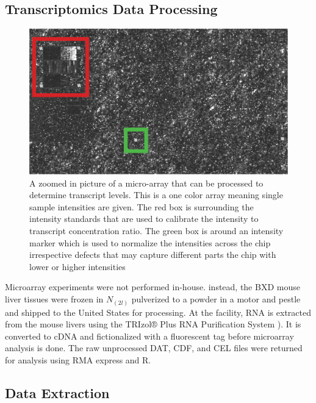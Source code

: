 \documentclass[a4paper,11pt,twoside]{book}
\begin{document}
	\subsection{Transcriptomics Data Processing}
	\begin{figure}
		\includegraphics[width = 1.0\linewidth]{3.Trancriptomics/Affimetrix_Chip_ZoomIn.png}
		\caption{A zoomed in picture of a micro-array that can be processed to determine transcript levels. This is a one color array meaning single sample intensities are given. The red box is surrounding the intensity standards that are used to calibrate the intensity to transcript concentration ratio. The green box is around an intensity marker which is used to normalize the intensities across the chip irrespective defects that may capture different parts the chip with lower or higher intensities}
		\label{fig: Zoomed-in Photograph of a Microarray}
	\end{figure}
	
    Microarray experiments were not performed in-house. instead, the BXD mouse liver tissues were frozen in $N_(2l)$ pulverized to a powder in a motor and pestle and shipped to the United States for processing. At the facility, RNA is extracted from the mouse livers using the TRIzol® Plus RNA Purification System \citep{Rio2010TRIzol}). It is converted to cDNA and fictionalized with a fluorescent tag before microarray analysis is done. The raw unprocessed DAT, CDF, and CEL files were returned for analysis using RMA express and R.
	
	
	\subsection{Data Extraction} 
	
\end{document}
